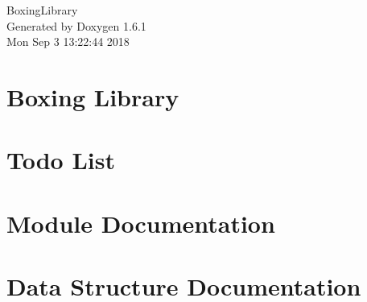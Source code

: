 \documentclass[a4paper]{article}
\begin{document}
\hypersetup{pageanchor=false}
\begin{titlepage}
\vspace*{7cm}
\begin{center}
{\Large BoxingLibrary }\\
\vspace*{1cm}
{\large Generated by Doxygen 1.6.1}\\
\vspace*{0.5cm}
{\small Mon Sep 3 13:22:44 2018}\\
\end{center}
\end{titlepage}
\tableofcontents
{}
\hypersetup{pageanchor=true}
\section{Boxing Library}
\label{index}\hypertarget{index}{}
\section{Todo List}
\label{todo}
\hypertarget{todo}{}

\section{Module Documentation}




\section{Data Structure Documentation}




\printindex
\end{document}
